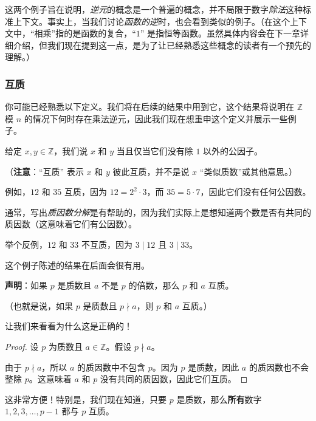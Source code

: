 这两个例子旨在说明，\emph{逆元}的概念是一个普遍的概念，并不局限于数字\emph{除法}这种标准上下文。事实上，当我们讨论\emph{函数的逆}时，也会看到类似的例子。（在这个上下文中，``相乘''指的是函数的复合，``$1$'' 是指恒等函数。虽然具体内容会在下一章详细介绍，但我们现在提到这一点，是为了让已经熟悉这些概念的读者有一个预先的理解。）

\subsubsection*{互质}

你可能已经熟悉以下定义。我们将在后续的结果中用到它，这个结果将说明在 $\mathbb{Z}$ 模 $n$ 的情况下何时存在乘法逆元，因此我们现在想重申这个定义并展示一些例子。

\begin{definition}
    给定 $x,y \in \mathbb{Z}$，我们说 $x$ 和 $y$ 当且仅当它们没有除 $1$ 以外的公因子。
\end{definition}

（\textbf{注意}：``互质'' 表示 $x$ 和 $y$ 彼此互质，并不是说 $x$ ``类似质数''或其他意思。）\\

\begin{example}
    例如，$12$ 和 $35$ 互质，因为 $12 = 2^2 \cdot 3$，而 $35 = 5 \cdot 7$，因此它们没有任何公因数。

    通常，写出\emph{质因数分解}是有帮助的，因为我们实际上是想知道两个数是否有共同的质因数（这意味着它们有公因数）。

    举个反例，$12$ 和 $33$ 不互质，因为 $3 \mid 12$ 且 $3 \mid 33$。
\end{example}

\begin{example}
    这个例子陈述的结果在后面会很有用。

    \textbf{声明}：如果 $p$ 是质数且 $a$ 不是 $p$ 的倍数，那么 $p$ 和 $a$ 互质。

    （也就是说，如果 $p$ 是质数且 $p \nmid a$，则 $p$ 和 $a$ 互质。）

    让我们来看看为什么这是正确的！

    \begin{proof}
        设 $p$ 为质数且 $a \in \mathbb{Z}$。假设 $p \nmid a$。

        由于 $p \nmid a$，所以 $a$ 的质因数中不包含 $p$。因为 $p$ 是质数，因此 $a$ 的质因数也不会整除 $p$。这意味着 $a$ 和 $p$ 没有共同的质因数，因此它们互质。
    \end{proof}

    这非常方便！特别是，我们现在知道，只要 $p$ 是质数，那么\textbf{所有}数字 $1, 2, 3, \dots , p-1$ 都与 $p$ 互质。
\end{example}

